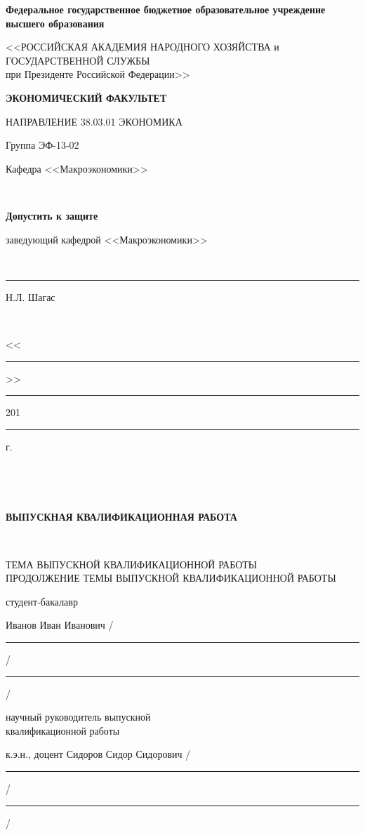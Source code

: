 \documentclass[12pt,a4paper, oneside]{extreport}
\begin{document}
\thispagestyle{empty} %

\begin{center}
\small \bfseries Федеральное государственное бюджетное образовательное учреждение высшего образования

<<РОССИЙСКАЯ АКАДЕМИЯ НАРОДНОГО ХОЗЯЙСТВА и\\ ГОСУДАРСТВЕННОЙ СЛУЖБЫ \\
при Президенте Российской Федерации>>

\vspace{2ex}

\bfseries
ЭКОНОМИЧЕСКИЙ ФАКУЛЬТЕТ

НАПРАВЛЕНИЕ 38.03.01 ЭКОНОМИКА
\end{center}

\vfill


\noindent\small Группа ЭФ-13-02
\hfill
\parbox[t]{20em}{\centering\small
Кафедра <<Макроэкономики>>

\mbox{ }

\textbf{Допустить к защите}

заведующий кафедрой <<Макроэкономики>>

\mbox{ }

\rule{8em}{0.5pt} Н.Л. Шагас

\mbox{ }

<<\rule{2em}{0.5pt}>> \rule{5em}{0.5pt} 201\rule{1em}{0.5pt} г. }

\mbox{ }

\mbox{ }

\begin{center}\bfseries
ВЫПУСКНАЯ КВАЛИФИКАЦИОННАЯ РАБОТА

\mbox{ }

\large
ТЕМА ВЫПУСКНОЙ КВАЛИФИКАЦИОННОЙ РАБОТЫ \\
ПРОДОЛЖЕНИЕ ТЕМЫ ВЫПУСКНОЙ КВАЛИФИКАЦИОННОЙ РАБОТЫ
\end{center}

\vfill

\noindent\normalsize
студент-бакалавр

\noindent
Иванов Иван Иванович
\hfill /\rule{6em}{0.5pt}/\rule{6em}{0.5pt}/

\hfill{}

\noindent
научный руководитель выпускной \\
квалификационной работы

\noindent
к.э.н., доцент Сидоров Сидор Сидорович
\hfill /\rule{6em}{0.5pt}/\rule{6em}{0.5pt}/
\end{document}
